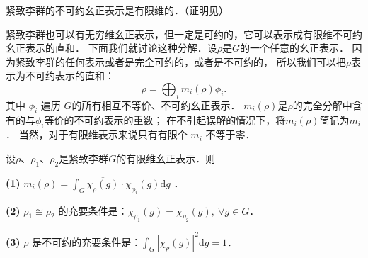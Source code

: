 \begin{theorem}\label{chlar:thm_FU}
	紧致李群的不可约幺正表示是有限维的．（证明见\parencite[p.349]{qiuws-2011}）
\end{theorem}

紧致李群也可以有无穷维幺正表示，但一定是可约的，它可以表示成有限维不可约幺正表示的直和．
下面我们就讨论这种分解．设$\rho$是$G$的一个任意的幺正表示．
因为紧致李群的任何表示或者是完全可约的，或者是不可约的，
所以我们可以把$\rho$表示为不可约表示的直和：
\begin{equation}\label{chlar:eqn_rphi}
	\rho=\bigoplus_i m_i(\rho) \phi_i .
\end{equation}
其中 $\phi_i$ 遍历 $G$的所有相互不等价、不可约幺正表示．
$m_i(\rho)$是$\rho$的完全分解中含有的与$\phi_i$等价的不可约表示的重数；
在不引起误解的情况下，将$m_i(\rho)$简记为$m_i$．
当然，对于有限维表示来说只有有限个 $m_i$ 不等于零．


\begin{theorem}\label{chlar:thm_GP-chi123}
	设$\rho$、$\rho_1$、$\rho_2$是紧致李群$G$的有限维幺正表示．则
	
	{\bfseries (1)} $m_i(\rho)=\int_G \overline{\chi_\rho(g)} \cdot \chi_{\phi_i}(g) \mathrm{d} g$ ．
	
	{\bfseries (2)} $\rho_1 \cong \rho_2$ 的充要条件是：$\chi_{\rho_1}(g)=\chi_{\rho_2}(g),\ \forall g \in G$．
	
	{\bfseries (3)} $\rho$ 是不可约的充要条件是：$\int_G\left|\chi_\rho(g)\right|^2 \mathrm{d} g=1$．	
\end{theorem}

